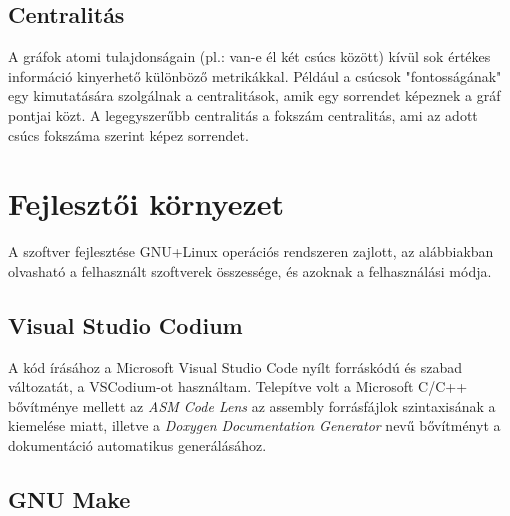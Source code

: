 \documentclass[12pt,numbers=noenddot]{report}
\begin{document}
\section{Centralitás}
A gráfok atomi tulajdonságain (pl.: van-e él két csúcs között) kívül sok értékes információ kinyerhető különböző metrikákkal. Például a csúcsok "fontosságának" egy kimutatására szolgálnak a centralitások, amik egy sorrendet képeznek a gráf pontjai közt. A legegyszerűbb centralitás a fokszám centralitás, ami az adott csúcs fokszáma szerint képez sorrendet.




\chapter{Fejlesztői környezet}

A szoftver fejlesztése GNU+Linux operációs rendszeren zajlott, az alábbiakban
olvasható a felhasznált szoftverek összessége, és azoknak a felhasználási módja.


\section{Visual Studio Codium}

A kód írásához a Microsoft Visual Studio Code nyílt forráskódú és szabad
változatát, a VSCodium-ot használtam. Telepítve volt a Microsoft C/C++
bővítménye mellett az \textit{ASM Code Lens} az assembly forrásfájlok
szintaxisának a kiemelése miatt, illetve a
\textit{Doxygen Documentation Generator} nevű bővítményt a dokumentáció
automatikus generálásához.


\section{GNU Make}
\end{document}
